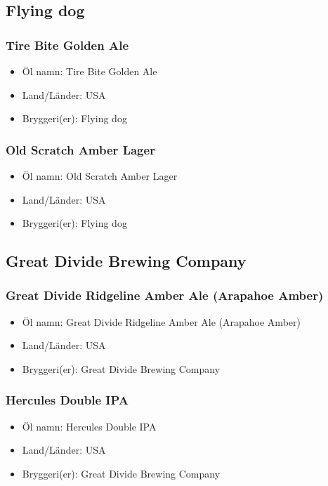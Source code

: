 \documentclass[11pt]{article}
\begin{document}
\subsection{Flying dog}
\label{sec:orgc0b5a03}
\subsubsection{Tire Bite Golden Ale}
\label{sec:org27f1b1f}
\begin{itemize}
\item Öl namn: Tire Bite Golden Ale
\item Land/Länder: USA
\item Bryggeri(er): Flying dog
\end{itemize}
\subsubsection{Old Scratch Amber Lager}
\label{sec:orgec4bf15}
\begin{itemize}
\item Öl namn: Old Scratch Amber Lager
\item Land/Länder: USA
\item Bryggeri(er): Flying dog
\end{itemize}
\subsection{Great Divide Brewing Company}
\label{sec:org4291808}
\subsubsection{Great Divide Ridgeline Amber Ale (Arapahoe Amber)}
\label{sec:org4989d3c}
\begin{itemize}
\item Öl namn: Great Divide Ridgeline Amber Ale (Arapahoe Amber)
\item Land/Länder: USA
\item Bryggeri(er): Great Divide Brewing Company
\end{itemize}
\subsubsection{Hercules Double IPA}
\label{sec:org9d7ca42}
\begin{itemize}
\item Öl namn: Hercules Double IPA
\item Land/Länder: USA
\item Bryggeri(er): Great Divide Brewing Company
\end{itemize}
\end{document}
